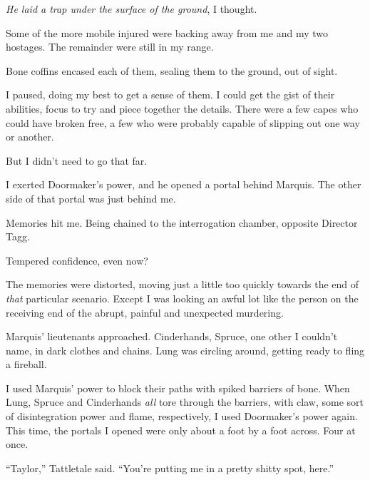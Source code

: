\emph{He laid a trap under the surface of the ground}, I thought.



Some of the more mobile injured were backing away from me and my two hostages.  The remainder were still in my range.



Bone coffins encased each of them, sealing them to the ground, out of sight.



I paused, doing my best to get a sense of them.  I could get the gist of their abilities, focus to try and piece together the details.  There were a few capes who could have broken free, a few who were probably capable of slipping out one way or another.



But I didn't need to go that far.



I exerted Doormaker's power, and he opened a portal behind Marquis.  The other side of that portal was just behind me.



Memories hit me.  Being chained to the interrogation chamber, opposite Director Tagg.



Tempered confidence, even now?



The memories were distorted, moving just a little too quickly towards the end of \emph{that} particular scenario.  Except I was looking an awful lot like the person on the receiving end of the abrupt, painful and unexpected murdering.



Marquis' lieutenants approached.  Cinderhands, Spruce, one other I couldn't name, in dark clothes and chains.  Lung was circling around, getting ready to fling a fireball.



I used Marquis' power to block their paths with spiked barriers of bone.  When Lung, Spruce and Cinderhands \emph{all} tore through the barriers, with claw, some sort of disintegration power and flame, respectively, I used Doormaker's power again.  This time, the portals I opened were only about a foot by a foot across.  Four at once.



``Taylor,'' Tattletale said.  ``You're putting me in a pretty shitty spot, here.''



